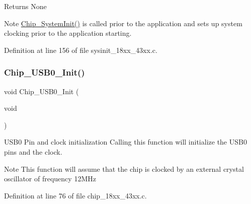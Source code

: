 \begin{DoxyReturn}{Returns}
None 
\end{DoxyReturn}
\begin{DoxyNote}{Note}
\hyperlink{group___s_u_p_p_o_r_t__18_x_x__43_x_x___f_u_n_c_ga3450fa020f6b569cc2deb69c11e11b7c}{Chip\+\_\+\+System\+Init()} is called prior to the application and sets up system clocking prior to the application starting. 
\end{DoxyNote}


Definition at line 156 of file sysinit\+\_\+18xx\+\_\+43xx.\+c.

\mbox{\label{group___s_u_p_p_o_r_t__18_x_x__43_x_x___f_u_n_c_ga3d92558011a1b37fdc6a0687691127c4}} 
\subsubsection{\texorpdfstring{Chip\+\_\+\+U\+S\+B0\+\_\+\+Init()}{Chip\_USB0\_Init()}}
{\footnotesize\ttfamily void Chip\+\_\+\+U\+S\+B0\+\_\+\+Init (\begin{DoxyParamCaption}\item[{void}]{ }\end{DoxyParamCaption})}



U\+S\+B0 Pin and clock initialization Calling this function will initialize the U\+S\+B0 pins and the clock. 

\begin{DoxyNote}{Note}
This function will assume that the chip is clocked by an external crystal oscillator of frequency 12\+M\+Hz 
\end{DoxyNote}


Definition at line 76 of file chip\+\_\+18xx\+\_\+43xx.\+c.

\mbox{\label{group___s_u_p_p_o_r_t__18_x_x__43_x_x___f_u_n_c_ga89df58e269eb3a9001c3eeafbbc95473}} 
